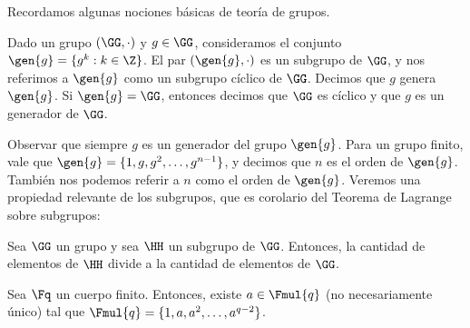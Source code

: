 Recordamos algunas nociones básicas de teoría de grupos.

\begin{definition}
	Dado un grupo $(\GG, \cdot)$ y $g \in \GG$, consideramos el conjunto $\gen{g} = \{g^k: k \in \Z\}$. El par $(\gen{g}, \cdot)$ es un subgrupo de $\GG$, y nos referimos a $\gen{g}$ como un subgrupo cíclico de $\GG$. Decimos que $g$ genera $\gen{g}$. Si $\gen{g} = \GG$, entonces decimos que $\GG$ es cíclico y que $g$ es un generador de $\GG$.
\end{definition}

Observar que siempre $g$ es un generador del grupo $\gen{g}$. Para un grupo finito, vale que $\gen{g} = \{1, g, g^2, \ldots, g^{n-1}\}$, y decimos que $n$ es el orden de $\gen{g}$. También nos podemos referir a $n$ como el orden de $\gen{g}$. Veremos una propiedad relevante de los subgrupos, que es corolario del Teorema de Lagrange sobre subgrupos:

\begin{theorem}
	Sea $\GG$ un grupo y sea $\HH$ un subgrupo de $\GG$. Entonces, la cantidad de elementos de $\HH$ divide a la cantidad de elementos de $\GG$.
\end{theorem}

\begin{theorem}
	Sea $\Fq$ un cuerpo finito. Entonces, existe $a \in \Fmul{q}$ (no necesariamente único) tal que $\Fmul{q} = \{1, a, a^2, \ldots, a^{q-2}\}$.
\end{theorem}
